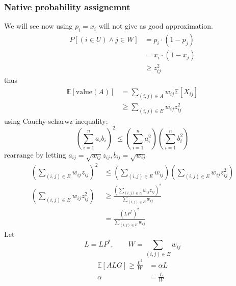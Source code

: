 \documentclass[10pt]{article}
\theoremstyle{definition}
\begin{document}
\subsubsection*{Native probability assignemnt}
We will see now using $p_i = x_i$ will not give as good approximation. 
\begin{align*}
  P[(i \in U) \land j \in W] &= p_i \cdot (1 - p_j) \\
  &= x_i \cdot (1 - x_j)\\
  &\geq z_{ij}^2
\end{align*}
thus 
\begin{align*}
  \mathbb{E}[\text{value}(A)]&=\sum_{(i,j)\in A} w_{ij} \mathbb{E}[X_{ij}]\\
  &\geq \sum_{(i,j)\in E} w_{ij} z_{ij}^2
\end{align*}
using Cauchy-scharwz inequality: 
\[(\sum_{i=1}^{n} a_i b_i)^2 \leq (\sum_{i=1}^{n} a_i^2)(\sum_{i=1}^{n} b_i^2)\]
rearrange by letting $a_{ij} = \sqrt{w_{ij}} z_{ij}, b_{ij} = \sqrt{w_{ij}}$
\begin{align*}
  (\sum_{(i,j)\in E} w_{ij} z_{ij})^2 &\leq (\sum_{(i,j)\in E} w_{ij})(\sum_{(i,j)\in E} w_{ij} z_{ij}^2)\\
  (\sum_{(i,j)\in E} w_{ij} z_{ij}^2) &\geq \frac{(\sum_{(i,j)\in E} w_{ij} z_{ij})^2}{\sum_{(i,j)\in E} w_{ij}}\\
  &= \frac{(LP^*)^2}{\sum_{(i,j)\in E} w_{ij}}
\end{align*}
Let 
\[L = LP^*, \quad\quad W = \sum_{(i,j)\in E} w_{ij}\]
\begin{align*}
  \mathbb{E}[ALG] \geq \frac{L^2}{W} &= \alpha L\\
  \alpha &= \frac{L}{W}
\end{align*}
\end{document}
